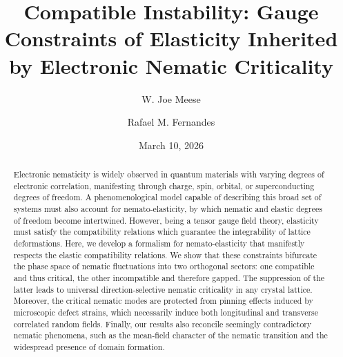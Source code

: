 \documentclass[aps,prb, twocolumn, superscriptaddress, amsmath, amsfonts, amssymb, amsthm]{revtex4-2}
\begin{document}
\title{Compatible Instability: Gauge Constraints of Elasticity Inherited by Electronic Nematic Criticality}
\author{W. Joe Meese}
\author{Rafael M. Fernandes}
\date{March 10, 2026}
\begin{abstract}
Electronic nematicity is widely observed in quantum materials with varying degrees of electronic correlation, manifesting through charge, spin, orbital, or superconducting degrees of freedom. A phenomenological model capable of describing this broad set of systems must also account for nemato-elasticity, by which nematic and elastic degrees of freedom become intertwined. However, being a tensor gauge field theory, elasticity must satisfy the compatibility relations which guarantee the integrability of lattice deformations. Here, we develop a formalism for nemato-elasticity that manifestly respects the elastic compatibility relations. We show that these constraints bifurcate the phase space of nematic fluctuations into two orthogonal sectors: one compatible and thus critical, the other incompatible and therefore gapped. The suppression of the latter leads to universal direction-selective nematic criticality in any crystal lattice. Moreover, the critical nematic modes are protected from pinning effects induced by microscopic defect strains, which necessarily induce both longitudinal and transverse correlated random fields. Finally, our results also reconcile seemingly contradictory nematic phenomena, such as the mean-field character of the nematic transition and the widespread presence of domain formation.
\end{abstract}
\maketitle
\end{document}
